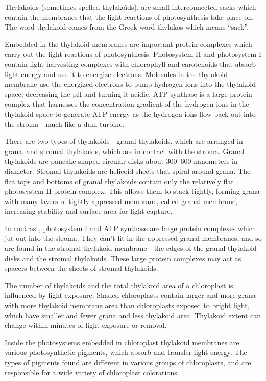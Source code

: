 Thylakoids (sometimes spelled thylakoïds), are small interconnected sacks which contain the membranes that the light reactions of photosynthesis take place on. The word thylakoid comes from the Greek word thylakos which means ``sack''.

Embedded in the thylakoid membranes are important protein complexes which carry out the light reactions of photosynthesis. Photosystem II and photosystem I contain light-harvesting complexes with chlorophyll and carotenoids that absorb light energy and use it to energize electrons. Molecules in the thylakoid membrane use the energized electrons to pump hydrogen ions into the thylakoid space, decreasing the pH and turning it acidic. ATP synthase is a large protein complex that harnesses the concentration gradient of the hydrogen ions in the thylakoid space to generate ATP energy as the hydrogen ions flow back out into the stroma---much like a dam turbine.

There are two types of thylakoids---granal thylakoids, which are arranged in grana, and stromal thylakoids, which are in contact with the stroma. Granal thylakoids are pancake-shaped circular disks about 300--600 nanometers in diameter. Stromal thylakoids are helicoid sheets that spiral around grana. The flat tops and bottoms of granal thylakoids contain only the relatively flat photosystem II protein complex. This allows them to stack tightly, forming grana with many layers of tightly appressed membrane, called granal membrane, increasing stability and surface area for light capture.

In contrast, photosystem I and ATP synthase are large protein complexes which jut out into the stroma. They can't fit in the appressed granal membranes, and so are found in the stromal thylakoid membrane---the edges of the granal thylakoid disks and the stromal thylakoids. These large protein complexes may act as spacers between the sheets of stromal thylakoids.

The number of thylakoids and the total thylakoid area of a chloroplast is influenced by light exposure. Shaded chloroplasts contain larger and more grana with more thylakoid membrane area than chloroplasts exposed to bright light, which have smaller and fewer grana and less thylakoid area. Thylakoid extent can change within minutes of light exposure or removal.

Inside the photosystems embedded in chloroplast thylakoid membranes are various photosynthetic pigments, which absorb and transfer light energy. The types of pigments found are different in various groups of chloroplasts, and are responsible for a wide variety of chloroplast colorations.

